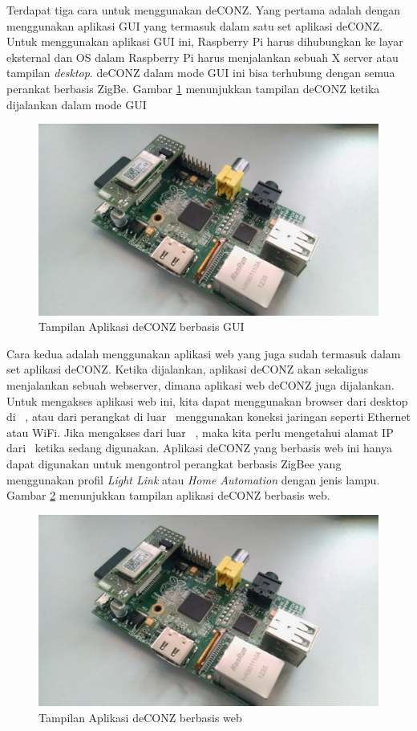 Terdapat tiga cara untuk menggunakan deCONZ. Yang pertama adalah dengan menggunakan aplikasi GUI yang termasuk dalam satu set aplikasi deCONZ. Untuk menggunakan aplikasi GUI ini, Raspberry Pi harus dihubungkan ke layar eksternal dan OS dalam Raspberry Pi harus menjalankan sebuah X server atau tampilan \textit{desktop}. deCONZ dalam mode GUI ini bisa terhubung dengan semua perankat berbasis ZigBe. Gambar \ref{fig:deconz-gui} menunjukkan tampilan deCONZ ketika dijalankan dalam mode GUI

\begin{figure}
	\centering
	\includegraphics[width=.9\textwidth]{pics/raspberry+raspbee.jpg}
	\caption{Tampilan Aplikasi deCONZ berbasis GUI}
	\label{fig:deconz-gui}
\end{figure}

Cara kedua adalah menggunakan aplikasi web yang juga sudah termasuk dalam set aplikasi deCONZ. Ketika dijalankan, aplikasi deCONZ akan sekaligus menjalankan sebuah webserver, dimana aplikasi web deCONZ juga dijalankan. Untuk mengakses aplikasi web ini, kita dapat menggunakan browser dari desktop di \rasp~, atau dari perangkat di luar \rasp~menggunakan koneksi jaringan seperti Ethernet atau WiFi. Jika mengakses dari luar \rasp~, maka kita perlu mengetahui alamat IP dari \rasp~ketika sedang digunakan. Aplikasi deCONZ yang berbasis web ini hanya dapat digunakan untuk mengontrol perangkat berbasis ZigBee yang menggunakan profil \textit{Light Link} atau \textit{Home Automation} dengan jenis lampu. Gambar \ref{fig:deconz-web} menunjukkan tampilan aplikasi deCONZ berbasis web.

\begin{figure}
	\centering
	\includegraphics[width=.9\textwidth]{pics/raspberry+raspbee.jpg}
	\caption{Tampilan Aplikasi deCONZ berbasis web}
	\label{fig:deconz-web}
\end{figure}

